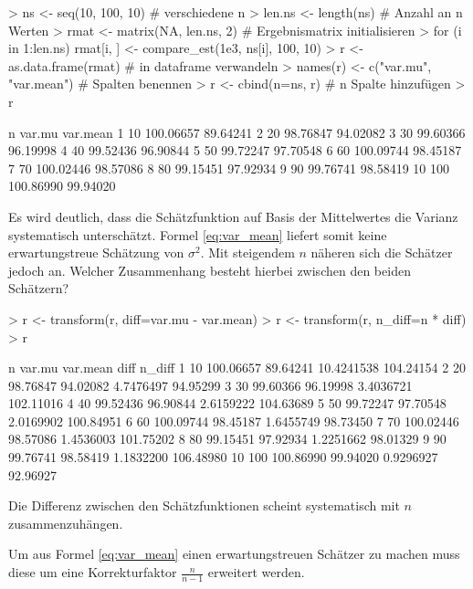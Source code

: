 \begin{Schunk}
\begin{Sinput}
> ns <- seq(10, 100, 10)              # verschiedene n
> len.ns <- length(ns)                # Anzahl an n Werten
> rmat <- matrix(NA, len.ns, 2)       # Ergebnismatrix initialisieren
> for (i in 1:len.ns)
   rmat[i, ] <- compare_est(1e3, ns[i], 100, 10)    
> r <- as.data.frame(rmat)            # in dataframe verwandeln
> names(r) <- c("var.mu", "var.mean") # Spalten benennen
> r <- cbind(n=ns, r)                 # n Spalte hinzufügen
> r
\end{Sinput}
\begin{Soutput}
     n    var.mu var.mean
1   10 100.06657 89.64241
2   20  98.76847 94.02082
3   30  99.60366 96.19998
4   40  99.52436 96.90844
5   50  99.72247 97.70548
6   60 100.09744 98.45187
7   70 100.02446 98.57086
8   80  99.15451 97.92934
9   90  99.76741 98.58419
10 100 100.86990 99.94020
\end{Soutput}
\end{Schunk}

Es wird deutlich, dass die Schätzfunktion auf Basis der Mittelwertes die Varianz systematisch unterschätzt. Formel \ref{eq:var_mean} liefert somit keine erwartungstreue Schätzung von $\sigma^2$. Mit steigendem $n$ näheren sich die Schätzer jedoch an.  Welcher Zusammenhang besteht hierbei zwischen den beiden Schätzern? 

\begin{Schunk}
\begin{Sinput}
> r <- transform(r, diff=var.mu - var.mean)
> r <- transform(r, n_diff=n * diff) 
> r
\end{Sinput}
\begin{Soutput}
     n    var.mu var.mean       diff    n_diff
1   10 100.06657 89.64241 10.4241538 104.24154
2   20  98.76847 94.02082  4.7476497  94.95299
3   30  99.60366 96.19998  3.4036721 102.11016
4   40  99.52436 96.90844  2.6159222 104.63689
5   50  99.72247 97.70548  2.0169902 100.84951
6   60 100.09744 98.45187  1.6455749  98.73450
7   70 100.02446 98.57086  1.4536003 101.75202
8   80  99.15451 97.92934  1.2251662  98.01329
9   90  99.76741 98.58419  1.1832200 106.48980
10 100 100.86990 99.94020  0.9296927  92.96927
\end{Soutput}
\end{Schunk}

Die Differenz zwischen den Schätzfunktionen scheint systematisch mit $n$ zusammenzuhängen.

Um aus Formel \ref{eq:var_mean} einen erwartungstreuen Schätzer zu machen muss diese um eine Korrekturfaktor $\frac{n}{n-1}$ erweitert werden. 

